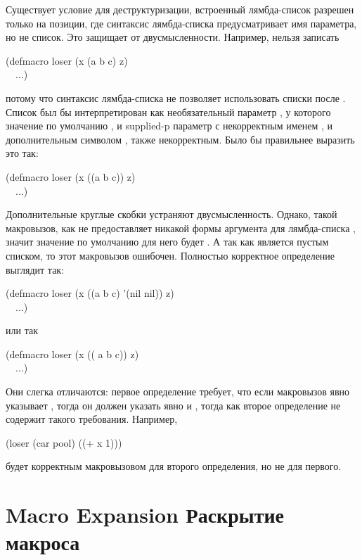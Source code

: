 \begin{defmac}
Существует условие для деструктуризации, встроенный лямбда-список разрешен
только на позиции, где синтаксис лямбда-списка предусматривает имя параметра, но
не список. Это защищает от двусмысленности. Например, нельзя записать
\begin{lisp}
(defmacro loser (x  (a b  c)  z) \\
~~...)
\end{lisp}
потому что синтаксис лямбда-списка не позволяет использовать списки после
. Список  был бы интерпретирован как
необязательный параметр , у которого значение по умолчанию , и
supplied-p параметр с некорректным именем , и дополнительным символом
, также некорректным. Было бы правильнее выразить это так:
\begin{lisp}
(defmacro loser (x  ((a b  c))  z) \\
~~...)
\end{lisp}
Дополнительные круглые скобки устраняют двусмысленность. Однако, такой
макровызов, как  не предоставляет никакой формы аргумента
для лямбда-списка  , значит значение по умолчанию для
него будет {\nil}. А так как {\nil} является пустым списком, то этот макровызов
ошибочен. Полностью корректное определение выглядит так:
\begin{lisp}
(defmacro loser (x  ((a b  c) '(nil nil))  z) \\
~~...)
\end{lisp}
или так
\begin{lisp}
(defmacro loser (x  (( a b  c))  z) \\
~~...)
\end{lisp}
Они слегка отличаются: первое определение требует, что если макровызов явно
указывает , тогда он должен указать явно и , тогда как второе
определение не содержит такого требования. Например,
\begin{lisp}
(loser (car pool) ((+ x 1)))
\end{lisp}
будет корректным макровызовом для второго определения, но не для первого.
\end{defmac}

\section{Macro Expansion Раскрытие макроса}

